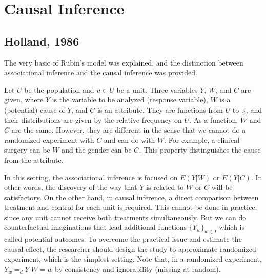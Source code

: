 \section{Causal Inference}

\subsection{Holland, 1986 \cite{holland1986}}
The very basic of Rubin's model was explained,
and the distinction between associational inference and the causal inference was provided.

Let $U$ be the population and $u \in U$ be a unit.
Three variables $Y$, $W$, and $C$ are given,
where $Y$ is the variable to be analyzed (response variable),
$W$ is a (potential) cause of $Y$,
and $C$ is an attribute.
They are functions from $U$ to $\mathbb{R}$,
and their distributions are given by the relative frequency on $U$.
As a function, $W$ and $C$ are the same.
However, they are different in the sense that
we cannot do a randomized experiment with $C$
and can do with $W$.
For example, a clinical surgery can be $W$ and the gender can be $C$.
This property distinguishes the cause from the attribute.

In this setting, the associational inference is focused on $E(Y\lvert W)$ or $E(Y \lvert C)$.
In other words, the discovery of the way that $Y$ is related to $W$ or $C$ will be satisfactory.
%
On the other hand, in causal inference, 
a direct comparison between treatment and control for each unit is required.
This cannot be done in practice, since any unit cannot receive both treatments simultaneously.
But we can do counterfactual imaginations that lead additional functions $\{Y_w\}_{w\in I}$
which is called potential outcomes.
To overcome the practical issue and estimate the causal effect,
the researcher should design the study to approximate randomized experiment,
which is the simplest setting.
%
Note that, in a randomized experiment, 
$Y_w =_d Y\lvert W = w$ by consistency and ignorability (missing at random).
